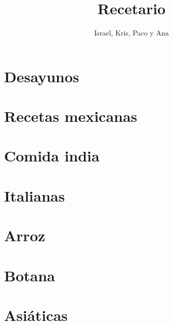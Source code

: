 \documentclass[twoside,12pt]{article}
\date{}
\author{Israel, Kris, Paco y Ana}
\title{Recetario}
\begin{document}
\maketitle

\tableofcontents

\newpage
\section{Desayunos}




\section{Recetas mexicanas}












\section{Comida india}



\section{Italianas}





\section{Arroz}





\section{Botana}


\section{Asi\'aticas}

\end{document}
